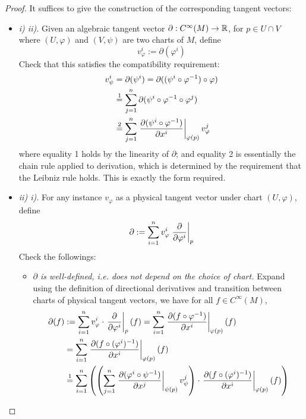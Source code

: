 \documentclass{article}
\begin{document}
\begin{proof}
    It suffices to give the construction of the corresponding tangent vectors:
    \begin{itemize}
        \item \emph{i) \implies ii).} Given an algebraic tangent vector $\partial: C^{\infty}(M) \to \mathbb{R}$, for $p \in U \cap V$ where $(U, \varphi)$ and $(V, \psi)$ are two charts of $M$, define
        \[
            v_{\varphi}^i := \partial(\varphi^i)
        \]
        Check that this satisfies the compatibility requirement: 
        \begin{align*}
            v_{\psi}^i
            & = \partial(\psi^i) = \partial((\psi^i \circ \varphi^{-1}) \circ \varphi) \\
            & \overset{1}{=} \sum_{j=1}^n \partial(\psi^i \circ \varphi^{-1} \circ \varphi^j) \\
            & \overset{2}{=} \sum_{j=1}^n \left.\frac{\partial (\psi^i \circ \varphi^{-1})}{\partial x^i}\right|_{\varphi(p)} v_{\varphi}^j
        \end{align*}
        where equality 1 holds by the linearity of $\partial$; and equality 2 is essentially the chain rule applied to derivation, which is determined by the requirement that the Leibniz rule holds. This is exactly the form required.
        \item \emph{ii) \implies i).} For any instance $v_{\varphi}$ as a physical tangent vector under chart $(U, \varphi)$, define
        \[
            \partial := \sum_{i=1}^n v_{\varphi}^i \left.\frac{\partial }{\partial \varphi^i}\right|_{p}
        \]
        Check the followings:
        \begin{itemize}
            \item \emph{$\partial$ is well-defined, i.e. does not depend on the choice of chart.} Expand using the definition of directional derivatives and transition between charts of physical tangent vectors, we have for all $f \in C^{\infty}(M)$,
            \begin{align*}
                \partial(f)
                & := \sum_{i = 1}^n v_{\varphi}^i \cdot \restr{\pp{}{\varphi^i}}{p}(f) = \sum_{i = 1}^n \restr{\pp{(f \circ \varphi^{-1})}{x^i}}{\varphi(p)} (f) \\
                & = \sum_{i = 1}^n \restr{\pp{(f \circ (\varphi^i)^{-1})}{x^i}}{\varphi(p)} (f) \\
                & \overset{1}{=} \sum_{i = 1}^n \left( \left( \sum_{j=1}^{n} \restr{\pp{(\varphi^i \circ \psi^{-1})}{x^j}}{\psi(p)} v_{\psi}^j \right) \cdot \restr{\pp{(f \circ (\varphi^i)^{-1})}{x^i}}{\varphi(p)} (f) \right) \\

\end{align*}
\end{itemize}
\end{itemize}
\end{proof}
\end{document}
